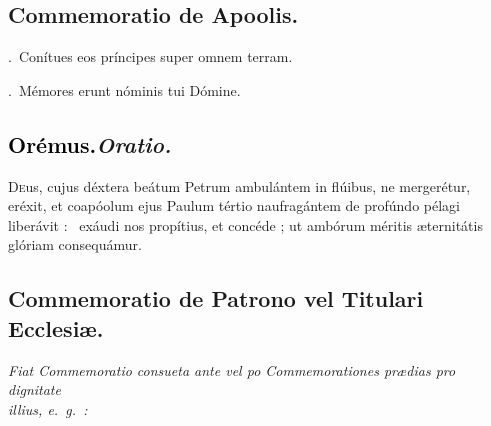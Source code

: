 \documentclass[12pt]{article} %
\newenvironment{rubric}{\vspace{1 mm}\color{benred8} \itshape \leftskip 0in \setlength{\parindent}{0.25in}}{\vspace{1 mm}}
\newenvironment{response}{\leftskip 0in \setlength{\parindent}{0in}}{\vspace{1 mm}}
\let\oldgresixstar\gresixstar
\renewcommand{\gresixstar}{\textcolor{benred8}{\oldgresixstar}}
\let\oldVbar\Vbar
\renewcommand{\Vbar}{\textcolor{benred8}{\oldVbar .}}
\let\oldRbar\Rbar
\renewcommand{\Rbar}{\textcolor{benred8}{\oldRbar .}}
\def\capitulumSpace{\hspace{20 mm}}
\begin{document}
\subsection*{Commemoratio de Apoolis.}


\gresetfirstlineaboveinitial{\small \textsc{ \textbf{\textcolor{benred8}{VIII}}}}{\small \textsc{ \textbf{\textcolor{benred8}{VIII}}}}

\begin{response}
\Vbar\ Con\'{i}tues eos pr\'{i}ncipes super omnem terram.

\Rbar\ M\'{e}mores erunt n\'{o}minis tui D\'{o}mine.

\end{response}

\subsection*{\textcolor{black}{Or\'{e}mus.}\capitulumSpace \emph{Oratio.}}

\begin{response}\lettrine{D}{e}us, cujus d\'{e}xtera be\'{a}tum Petrum ambul\'{a}ntem in fl\'{u}ibus, ne merger\'{e}tur, er\'{e}xit, et coap\'{o}olum ejus Paulum t\'{e}rtio naufrag\'{a}ntem de prof\'{u}ndo p\'{e}lagi liber\'{a}vit : \gresixstar\ ex\'{a}udi nos prop\'{i}tius, et conc\'{e}de ; ut amb\'{o}rum m\'{e}ritis \ae ternit\'{a}tis gl\'{o}riam consequ\'{a}mur.

\end{response}

\newpage


\subsection*{Commemoratio de Patrono vel Titulari Ecclesi\ae .}

\begin{rubric}
Fiat Commemoratio consueta ante vel po Commemorationes pr\ae dias pro dignitate\\illius, e.~g.~:

\end{rubric}
\end{document}
